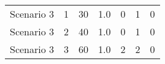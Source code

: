 {\begin{tabular}{lllllll}
	Scenario 3 & 1             & 30                 & 1.0          & 0                                                                          & 1					& 0                                                                                \\
	Scenario 3 & 2             & 40                 & 1.0          & 0                                                                          & 1					& 0                                                                                \\
	Scenario 3 & 3             & 60                 & 1.0          & 2                                                                          & 2					& 0                                                                                 \\
	\bottomrule
\end{tabular}

\vspace{1cm}
}
